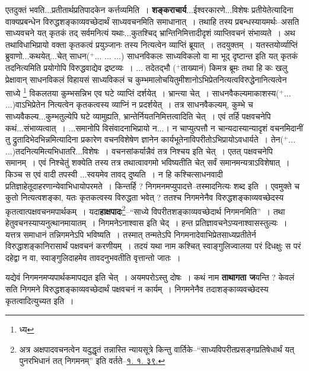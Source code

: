 \documentclass[article,12pt,a4paper]{memoir}
\newcommand{\add}[1]{($^{+}$#1)}
\begin{document}
	  \pstart एतदुक्तं भवति...प्रतीतार्थप्रतिपादकेन कर्त्तव्यमिति । \textbf{शङ्कराचार्य}...ईश्वरकारणे...विशेषः प्रतीयेतेत्यादिना वाक्यप्रबन्धेन विरुद्धशङ्काव्यवच्छेदार्थं साध्यवचनमिति समाधानात् । तथाहि तस्य प्रबन्धस्यायमर्थः--असति साध्यवचने यत् कृतकं तद् सर्वमनित्यं  \leavevmode{} यथाः...कुतश्चिद् भ्रान्तिनिमित्तादीदृशं व्याप्तिवचनं संभाव्यते । अथ तथाविधाभिप्रायो वक्ता कृतकत्वं प्रयुञ्जानः तस्य नित्यत्वेन व्याप्तिं ब्रूयात् । तदयुक्तम् । यतस्तयोर्व्याप्तिं ब्रुवाणो...कथयेत्...चेत् साधन\add{... ... ...} साधनविकलः साध्यविकलो वा मा भूद् दृष्टान्त इति यत् कृतकं तदनित्यमिति प्रयोगोपि विरुद्धवाद्येव द्रष्टव्यः । ... तदेतद्भौ \add{ताख्यानं} किमत्र ब्रूमः तथा हि कः खलु प्रेक्षावान् साधनविकलं विहायसं साध्यविकलं च कुम्भमालोचयितुमीशानोऽभिप्रेतनित्यत्वविरुद्धेनानित्यत्वेन साध्ये \footnote{ध्य} विकलतया कुम्भसन्निभ एव घटे व्याप्तिं दर्शयेत् । भ्रान्त्या चेत् । साधनवैकल्यमाकाशस्य\add{... ...}वाऽभिप्रेतेन नित्यत्वेन कृतकत्वस्य व्याप्निं न प्रदर्शयेत् । तत्र साधनवैकल्यम्, कुम्भे च साध्यवैकल्य...कुम्भतुल्येपि घटे व्यामुह्यति, भ्रान्तेर्नियतनिमित्तत्वादिति चेत् । एवं तर्हि पक्षवचनेपि कथं...संभाव्यत्वात् । ...समानोपि विसंवादनाभिप्रायो न...। न चाप्युत्पत्तौ न चान्यदास्यान्यादृशं वचनमिदानीं तु द्रुतादिभेदभिन्नमित्यादिना प्रकारेण वचनविशेषेण ज्ञानेन कार्यभूतेनाविपरीतोऽभिप्रायोऽवधार्यते । तेन\add{... ...}तदनित्यमित्यभिधातरि...विशेषः । वचनसांकर्यान्नैवं तत्र निश्चय इति चेत् । एतत् पक्षवचनेपि समानम् । एवं निश्चेतुं शक्येति तस्य तत्र तथात्वावगमो भविष्यतीति चेत् सर्वं समानमन्यत्राऽविशेषात् । किञ्च स एवं वादी तपस्वी ...\leavevmode{}स्वयमेव तावद् दुष्यति । न हि कश्चित्साधनवादी प्रतिज्ञाहेतूदाहरणान्येवाभिधायोपरमते । किन्तर्हि ? निगमनमप्युपादत्ते--तस्मादनित्यः शब्द इति । एवमुक्ते च कुतो नित्यत्वशङ्का, यतः कृतकत्वस्य विरुद्धता भवेत् ? ततश्च निगमनेनैव विरुद्धशङ्काव्यवच्छेदस्य कृतत्वात्पक्षवचनमपार्थकम् । यदा\textbf{हाक्षपादः}\footnote{अत्र अक्षपादवचनत्वेन यदुद्धृतं तन्नास्ति न्यायसूत्रे किन्तु वार्तिके--“साध्यविपरीतप्रसङ्गप्रतिषेधार्थं यत् पुनरभिधानं तत् निगमनम्” इति वर्तते--\href{http://http://sarit.indology.info/?cref=}{१. १. ३९.}}--“साध्ये विपरीतशङ्काव्यवच्छेदार्थ निगमनमिति” । तथा हेतुवचनस्याप्यनुत्थानमायातम् । निगमनेऽनाश्वास इति चेद् । हन्त प्रतिज्ञावचनेऽप्यनाश्वासस्तुल्यः । यत्तत्र समाधानं तन्निगमनेऽपि भविष्यति । तस्मात् तन्मतेऽपि निगमनादेवाभिप्रेतसाध्यप्रतीतेर्न विरुद्धाशङ्कानिरासार्थं पक्षवचनं करणीयम् । तदयं यथा नाम कश्चित् स्वाङ्गुलिज्वालया परं दिधक्षुः स परं दहेद्वा न वा, स्वाङ्गुलिदाहमेव तावदनुभवतीति वृत्तान्तो जातः ।
	\pend
      

	  \pstart यद्येवं निगमनमप्यपार्थकमापद्यत इति चेत् । अयमपरोऽस्तु दोषः । कथं नाम \textbf{ताथागता ज}यन्ति ? केवलं सति निगमने विरुद्धशङ्काव्यवच्छेदार्थं पक्षवचनं न कार्यम् । निगमनेनैव तदाशङ्काव्यवच्छेदस्य कृतत्वादित्युच्यत इति ।
	\pend
      
\end{document}
